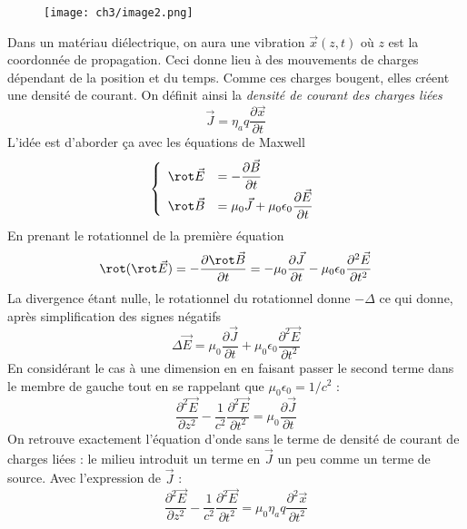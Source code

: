 \begin{wrapfigure}[6]{r}{9cm}
	\vspace{-5mm}
	\texttt{[image: ch3/image2.png]}
	\end{wrapfigure}
Dans un matériau diélectrique, on aura une vibration $\vec{x}(z,t)$ où $z$ est la coordonnée de propagation. 
Ceci donne lieu à des mouvements de charges dépendant de la position et du temps. Comme ces charges bougent, 
elles créent une densité de courant. On définit ainsi la \textit{densité de courant des charges liées}
\begin{equation}
\vec{J} = \eta_aq\dfrac{\partial \vec{x}}{\partial t}
\end{equation}
L'idée est d'aborder ça avec les équations de Maxwell
\begin{equation}
\left\{\begin{array}{ll}
\rot \vec{E} &= -\dfrac{\partial \vec{B}}{\partial t}\\
\rot \vec{B} &= \mu_0\vec{J} + \mu_0\epsilon_0\dfrac{\partial \vec{E}}{\partial t}
\end{array}\right.
\end{equation}
En prenant le rotationnel de la première équation
\begin{equation}
\rot(\rot\vec{E}) = -\dfrac{\partial \rot\vec{B}}{\partial t} = -\mu_0\dfrac{\partial \vec{J}}{\partial 
t} - \mu_0\epsilon_0\dfrac{\partial^2\vec{E}}{\partial t^2}
\end{equation}
La divergence étant nulle, le rotationnel du rotationnel donne $-\Delta$ ce qui donne, après simplification 
des signes négatifs
\begin{equation}
\Delta \vec{E} = \mu_0\dfrac{\partial\vec{J}}{\partial t}+\mu_0\epsilon_0\dfrac{\partial^2\vec{E}}{\partial 
t^2}
\end{equation}
En considérant le cas à une dimension en en faisant passer le second terme dans le membre de gauche tout en se rappelant que $\mu_0 \epsilon_0 = 1/c^2$ :
\begin{equation}
\dfrac{\partial^2\vec{E}}{\partial z^2} - \dfrac{1}{c^2}\dfrac{\partial^2\vec{E}}{\partial t^2} = \mu_0 
\dfrac{\partial\vec{J}}{\partial t}
\end{equation}
On retrouve exactement l'équation d'onde sans le terme de densité de courant de charges liées : le milieu 
introduit un terme en $\vec{J}$ un peu comme un terme de source. Avec l'expression de $\vec{J}$ :
\begin{equation}
\dfrac{\partial^2\vec{E}}{\partial z^2} - \dfrac{1}{c^2}\dfrac{\partial^2\vec{E}}{\partial t^2} = \mu_0 \eta_a 
q \dfrac{\partial^2\vec{x}}{\partial t^2}
\end{equation}

